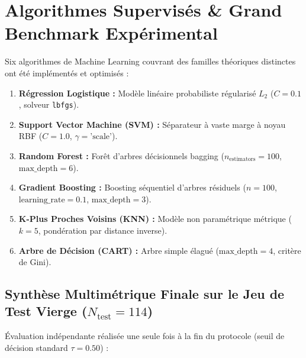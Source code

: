 \documentclass[10pt,a4paper]{article}
\begin{document}
\section{Algorithmes Supervisés \& Grand Benchmark Expérimental}

\noindent
Six algorithmes de Machine Learning couvrant des familles théoriques distinctes ont été implémentés et optimisés :
\begin{enumerate}[itemsep=2pt, parsep=0pt]
	\item \textbf{Régression Logistique :} Modèle linéaire probabiliste régularisé $L_2$ ($C=0.1$, solveur \texttt{lbfgs}).
	\item \textbf{Support Vector Machine (SVM) :} Séparateur à vaste marge à noyau RBF ($C=1.0$, $\gamma=\text{'scale'}$).
	\item \textbf{Random Forest :} Forêt d'arbres décisionnels bagging ($n_{\text{estimators}}=100$, $\text{max\_depth}=6$).
	\item \textbf{Gradient Boosting :} Boosting séquentiel d'arbres résiduels ($n=100$, $\text{learning\_rate}=0.1$, $\text{max\_depth}=3$).
	\item \textbf{K-Plus Proches Voisins (KNN) :} Modèle non paramétrique métrique ($k=5$, pondération par distance inverse).
	\item \textbf{Arbre de Décision (CART) :} Arbre simple élagué ($\text{max\_depth}=4$, critère de Gini).
\end{enumerate}

\subsection{Synthèse Multimétrique Finale sur le Jeu de Test Vierge \texorpdfstring{($N_{\text{test}} = 114$)}{(N_test = 114)}}
Évaluation indépendante réalisée une seule fois à la fin du protocole (seuil de décision standard $\tau = 0.50$) :
\end{document}

